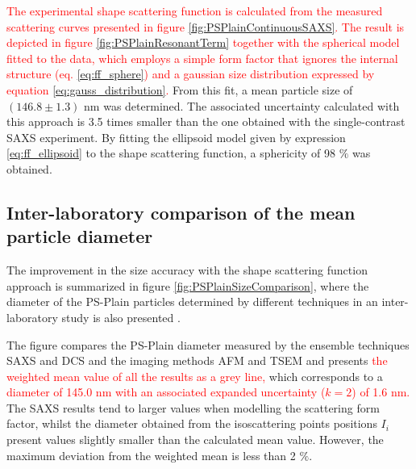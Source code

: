 \textcolor{red}{The experimental shape scattering function is calculated from the measured scattering curves presented in figure \ref{fig:PSPlainContinuousSAXS}. The result is depicted in figure \ref{fig:PSPlainResonantTerm} together with the spherical model fitted to the data, which employs a simple form factor that ignores the internal structure (eq. \ref{eq:ff_sphere}) and a gaussian size distribution expressed by equation \ref{eq:gauss_distribution}.} From this fit, a mean particle size of $(146.8\pm1.3)$ nm was determined. The associated uncertainty calculated with this approach is 3.5 times smaller than the one obtained with the single-contrast SAXS experiment. By fitting the ellipsoid model given by expression \ref{eq:ff_ellipsoid} to the shape scattering function, a sphericity of 98 $\%$ was obtained.

\subsection{Inter-laboratory comparison of the mean particle diameter}
\label{sec:interlab_size_comparison}
The improvement in the size accuracy with the shape scattering function approach is summarized in figure \ref{fig:PSPlainSizeComparison}, where the diameter of the PS-Plain particles determined by different techniques in an inter-laboratory study is also presented \citep{nicolet_inter-laboratory_2016}.

\begin{figure*}
	\centering
		
	\caption[Comparison of the PS-Plain particles average diameter with different techniques.]{Comparison of the PS-Plain average diameter obtained with different techniques, where the errorbars correspond to the expanded uncertainty ($k=2$). The circles correspond to results obtained with SAXS in the FCM beamline and the diamond to combined DCS measurements performed by NPL. The gray line defines the weighted average value   of all the results. The microscopy values are obtained from Belgian Service Métrologie-Metrologische Dienst (SMD), Swiss Federal Institute of Metrology (METAS) and Dutch Metrology Institute (VSL).}
	\label{fig:PSPlainSizeComparison}
\end{figure*}

The figure compares the PS-Plain diameter measured by the ensemble techniques SAXS and DCS and the imaging methods AFM and TSEM and presents \textcolor{red}{the weighted mean value of all the results as a grey line,} which corresponds to a \textcolor{red}{diameter of 145.0 nm with an associated expanded uncertainty ($k=2$) of 1.6 nm.} The SAXS results tend to larger values when modelling the scattering form factor, whilst the diameter obtained from the isoscattering points positions $I_i$ present values slightly smaller than the calculated mean value. However, the maximum deviation from the weighted mean is less than 2 $\%$.

